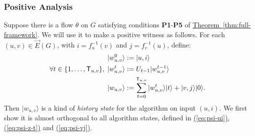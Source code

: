\documentclass{theoretics}
\newcommand{\eq}[1]{\hyperref[eq:#1]{(\ref*{eq:#1})}}
\newcommand{\thm}[1]{\hyperref[thm:#1]{Theorem~\ref*{thm:#1}}}
\def\ket#1{{\lvert}#1\rangle}
\renewcommand{\>}{\rangle}
\newcommand{\<}{\langle}
\renewcommand{\(}{\left(}
\renewcommand{\)}{\right)}
\begin{document}
\subsubsection{Positive Analysis}\label{sec:fwk-positive}


Suppose there is a flow $\theta$ on $G$ satisfying conditions \textbf{P1}-\textbf{P5} of \thm{full-framework}. We will use it to make a positive witness as follows. For each $(u,v)\in \overrightarrow{E}(G)$, with $i=f^{-1}_u(v)$ and $j=f_v^{-1}(u)$, define:
\begin{equation}
\begin{split}
\ket{w_{u,v}^0} &:= \ket{u,i}\\
\forall t\in \{1,\dots,{\sf T}_{u,v}\},\; \ket{w_{u,v}^t} &:= U_{t-1}\ket{w_{u,v}^{t-1}}\\
\ket{w_{u,v}} &:= \sum_{t=0}^{{\sf T}_{u,v}}\ket{w_{u,v}^t}\ket{t}+\ket{v,j}\ket{0}.
\end{split}\label{eq:full-fwk-w_uv}
\end{equation}
Then $\ket{w_{u,v}}$ is a kind of \emph{history state} \cite{kitaev1999quantum} for the algorithm on input $(u,i)$. We first show it is almost orthogonal to all algorithm states, defined in \eq{psi-ui}, \eq{psi-z-t} and \eq{psi-vj}.
\end{document}
